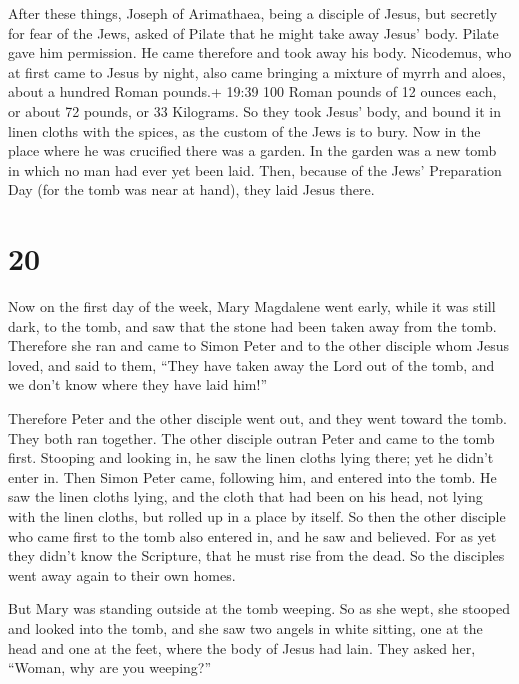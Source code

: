  After these things, Joseph of Arimathaea, being a disciple
of Jesus, but secretly for fear of the Jews, asked of Pilate that he
might take away Jesus' body. Pilate gave him permission. He came
therefore and took away his body.  Nicodemus, who at first
came to Jesus by night, also came bringing a mixture of myrrh and aloes,
about a hundred Roman pounds.+ 19:39 100 Roman pounds of 12 ounces each,
or about 72 pounds, or 33 Kilograms.  So they took Jesus'
body, and bound it in linen cloths with the spices, as the custom of the
Jews is to bury.  Now in the place where he was crucified
there was a garden. In the garden was a new tomb in which no man had
ever yet been laid.  Then, because of the Jews' Preparation
Day (for the tomb was near at hand), they laid Jesus there.

\hypertarget{section-19}{%
\section{20}\label{section-19}}

 Now on the first day of the week, Mary Magdalene went
early, while it was still dark, to the tomb, and saw that the stone had
been taken away from the tomb.  Therefore she ran and came
to Simon Peter and to the other disciple whom Jesus loved, and said to
them, ``They have taken away the Lord out of the tomb, and we don't know
where they have laid him!''

 Therefore Peter and the other disciple went out, and they
went toward the tomb.  They both ran together. The other
disciple outran Peter and came to the tomb first.  Stooping
and looking in, he saw the linen cloths lying there; yet he didn't enter
in.  Then Simon Peter came, following him, and entered into
the tomb. He saw the linen cloths lying,  and the cloth that
had been on his head, not lying with the linen cloths, but rolled up in
a place by itself.  So then the other disciple who came
first to the tomb also entered in, and he saw and believed. 
For as yet they didn't know the Scripture, that he must rise from the
dead.  So the disciples went away again to their own homes.

 But Mary was standing outside at the tomb weeping. So as
she wept, she stooped and looked into the tomb,  and she
saw two angels in white sitting, one at the head and one at the feet,
where the body of Jesus had lain.  They asked her, ``Woman,
why are you weeping?''

